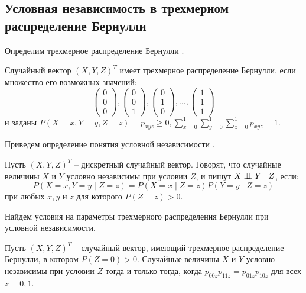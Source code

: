 \begin{centering}
    \subsection{Условная независимость в трехмерном распределение Бернулли}\label{ci_and_bernoulli}
\end{centering}
Определим трехмерное распределение Бернулли \cite{Dai2013, Teugels1990}.
\begin{definition}
    Случайный вектор $(X,Y,Z)^T$ имеет трехмерное распределение Бернулли,
    если множество его возможных значений:
    $$
        \begin{pmatrix}
            0 \\
            0 \\
            0
        \end{pmatrix},
        \begin{pmatrix}
            0 \\
            0 \\
            1
        \end{pmatrix},
        \begin{pmatrix}
            0 \\
            1 \\
            0
        \end{pmatrix}, \ldots, \begin{pmatrix}
            1 \\
            1 \\
            1
        \end{pmatrix}
    $$ и заданы $P(X=x,Y=y,Z=z)=p_{xyz} \geq 0,  \sum_{x=0}^1 \sum_{y=0}^1 \sum_{z=0}^1 p_{xyz} =1$.
\end{definition}
Приведем определение понятия условной независимости \cite{Lauritzen1996}.
\begin{definition}\label{cond_ind_def}
    Пусть $(X,Y,Z)^T$ -- дискретный случайный вектор.
    Говорят, что случайные величины $X$ и $Y$ условно независимы при условии $Z$,
    и пишут $X \perp\!\!\!\perp Y \mid Z$, если:
    $$
    P(X=x, Y=y \mid Z = z) = P(X=x \mid Z = z) P(Y=y \mid Z = z)
    $$
    при любых $x,y$ и $z$ для которого $P(Z=z)>0$.
\end{definition}
Найдем условия на параметры трехмерного распределения 
Бернулли при условной независимости.
\begin{theorem}\label{thm1}
    Пусть $(X,Y,Z)^T$ -- случайный вектор, имеющий трехмерное распределение Бернулли, в котором $P(Z=0)>0$.
    Случайные величины $X$ и $Y$ условно независимы при условии $Z$ тогда и только тогда, когда
    $p_{00z}p_{11z}=p_{01z}p_{10z}$ для всех $z=\overline{0,1}$.
\end{theorem}
